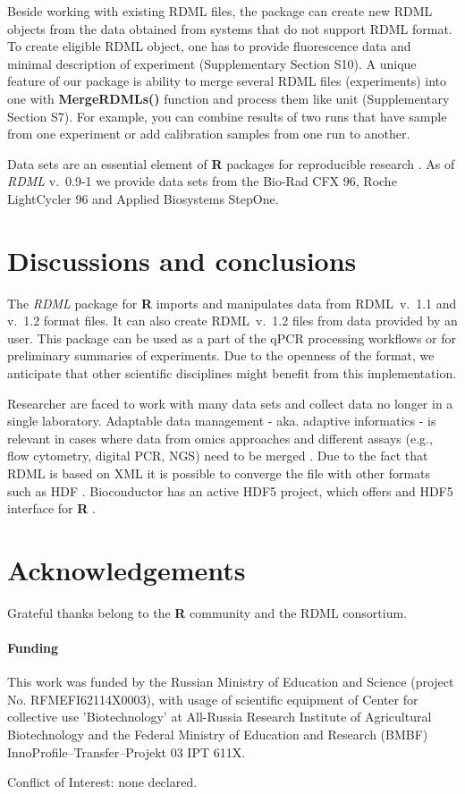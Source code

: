 \documentclass{bioinfo}
\begin{document}
	Beside working with existing RDML files, the package can create new RDML 
objects from the data obtained from systems that do not support RDML format. To 
create eligible RDML object, one has to provide fluorescence data and minimal 
description of experiment (Supplementary Section S10). A unique feature of our 
package is ability to merge several RDML files (experiments) into one with 
\textbf{MergeRDMLs()} function and process them like unit (Supplementary Section 
S7). For example, you can combine results of two runs that have sample from one 
experiment or add calibration samples from one run to another.

Data sets are an essential element of \textbf{R} packages for reproducible 
research \cite{roediger2015r}. As of \textit{RDML} v.~0.9-1 we provide data sets 
from the Bio-Rad CFX 96, Roche LightCycler 96 and Applied Biosystems StepOne.

\section{Discussions and conclusions}
	
	The \textit{RDML} package for \textbf{R} imports and manipulates data 
from RDML~v.~1.1 and v.~1.2 format files. It can also create RDML~v.~1.2 files 
from data provided by an user. This package can be used as a part of the qPCR 
processing workflows or for preliminary summaries of experiments. Due to the 
openness of the format, we anticipate that other scientific disciplines might 
benefit from this implementation.

Researcher are faced to work with many data sets and collect data no 
longer in a single laboratory. Adaptable data management - aka. adaptive 
informatics - is relevant in cases where data from omics approaches and 
different assays (e.g., flow cytometry, digital PCR, NGS) need to be merged 
\cite{baker_quantitative_2012}. Due to the fact that RDML is based on XML it is 
possible to converge the file with other formats such as HDF 
\cite{millard_adaptive_2011}. Bioconductor has an active HDF5 project, which 
offers and HDF5 interface for \textbf{R} \cite{Fischer_HDF5}.

\section{Acknowledgements}
Grateful thanks belong to the \textbf{R} community and the RDML consortium.
	
\paragraph{Funding\textcolon} This work was funded by the Russian 
Ministry of Education and Science (project No. RFMEFI62114X0003), with 
usage of scientific equipment of Center for collective use ’Biotechnology’ at 
All-Russia Research Institute of Agricultural Biotechnology and the Federal 
Ministry of Education and Research (BMBF) InnoProfile--Transfer--Projekt 03 IPT 
611X.
	
	
Conflict of Interest: none declared.

%
%
%
%
%
%

	
\end{document}
